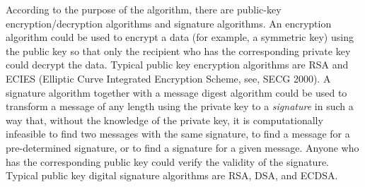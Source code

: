 \documentclass{article}
\begin{document}
According to the purpose of the algorithm, there are public-key
encryption/decryption algorithms and signature algorithms.
An encryption algorithm could be used to encrypt a data (for example,
a symmetric key) using the public key so that only the recipient 
who has the corresponding private key could decrypt the data.
Typical public key encryption algorithms are RSA and ECIES 
(Elliptic Curve Integrated Encryption Scheme, see, SECG 2000).
A signature algorithm together with a message digest algorithm 
could be used to transform a message of any length
using the private key to a {\em signature} in such a way that, without the
knowledge of the private key, it is computationally infeasible 
to find two messages with the same signature, to find a message for a 
pre-determined signature, or to find a signature for a given message.
Anyone who has the corresponding public key could verify the validity of the
signature. Typical public key digital signature algorithms are 
RSA, DSA, and ECDSA.
\end{document}
